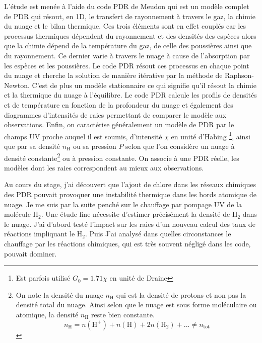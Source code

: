 \documentclass[11pt,a4paper]{article}
\begin{document}
\begin{spacing}{0.98}
L'étude est menée à l'aide du code PDR de Meudon \cite{LePetit2006} qui est un modèle complet de PDR qui résout, en 1D, le transfert de rayonnement à travers le gaz, la chimie du nuage et le bilan thermique. Ces trois éléments sont en effet couplés car les processus thermiques dépendent du rayonnement et des densités des espèces alors que la chimie dépend de la température du gaz, de celle des poussières ainsi que du rayonnement. Ce dernier varie à travers le nuage à cause de l'absorption par les espèces et les poussières. Le code PDR résout ces processus en chaque point du nuage et cherche la solution de manière itérative par la méthode de Raphson-Newton. C'est de plus un modèle stationnaire ce qui signifie qu'il résout la chimie et la thermique du nuage à l'équilibre. Le code PDR calcule les profils de densités et de température en fonction de la profondeur du nuage et également des diagrammes d'intensités de raies permettant de comparer le modèle aux observations. Enfin, on caractérise généralement un modèle de PDR par le champs UV proche auquel il est soumis, d'intensité $\chi$ en unité d'Habing \footnote{Est parfois utilisé $G_0 = 1.71\chi$ en unité de Draine}, ainsi que par sa densité $n_\mathrm{H}$ ou sa pression $P$ selon que l'on considère un nuage à densité constante\footnote{On note la densité du nuage $n_\mathrm{H}$ qui est la densité de protons et non pas la densité total du nuage. Ainsi selon que le nuage est sous forme moléculaire ou atomique, la densité $n_\mathrm{H}$ reste bien constante.
\begin{equation*}
n_\mathrm{H} =  n(\mathrm{H}^+) + n(\mathrm{H}) + 2n(\mathrm{H}_2) +  ... \neq n_\mathrm{tot}
\end{equation*}
} ou à pression constante. On associe à une PDR réelle, les modèles dont les raies correspondent au mieux aux observations.  \newline 

Au cours du stage, j'ai découvert que l'ajout de chlore dans les réseaux chimiques des PDR pouvait provoquer une instabilité thermique dans les bords atomique de nuage. Je me suis par la suite penché sur le chauffage par pompage UV de la molécule $\mathrm{H}_2$. Une étude fine nécessite d'estimer précisément la densité de $\mathrm{H}_2$ dans le nuage. J'ai d'abord testé l'impact sur les raies d'un nouveau calcul des taux de réactions impliquant le $\mathrm{H}_2$. Puis J'ai analysé dans quelles circonstances le chauffage par les réactions chimiques, qui est très souvent négligé dans les code, pouvait dominer. 




\end{spacing}
\end{document}
